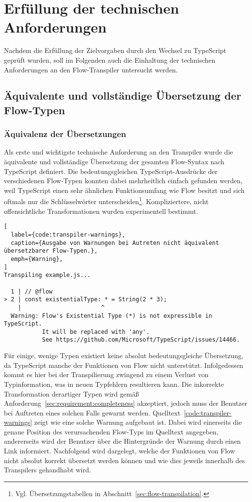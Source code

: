 \section{Erfüllung der technischen Anforderungen}

Nachdem die Erfüllung der Zielvorgaben durch den Wechsel zu TypeScript geprüft wurden, soll im Folgenden auch die Einhaltung der technischen Anforderungen an den Flow-Transpiler untersucht werden.

\subsection{Äquivalente und vollständige Übersetzung der Flow-Typen}
\label{sec:interpretation:equivalent-translation}

\subsubsection{Äquivalenz der Übersetzungen}

Als erste und wichtigste technische Anforderung an den Transpiler wurde die äquivalente und vollständige Übersetzung der gesamten Flow-Syntax nach TypeScript definiert. Die bedeutungsgleichen TypeScript-Ausdrücke der verschiedenen Flow-Typen konnten dabei mehrheitlich einfach gefunden werden, weil TypeScript einen sehr ähnlichen Funktionsumfang wie Flow besitzt und sich oftmals nur die Schlüsselwörter unterscheiden\footnote{Vgl. Übersetzungstabellen in Abschnitt~\ref{sec:flow-transpilation}.}. Kompliziertere, nicht offensichtliche Transformationen wurden experimentell bestimmt.

\begin{lstlisting}[
  label={code:transpiler-warnings},
  caption={Ausgabe von Warnungen bei Autreten nicht äquivalent übersetzbarer Flow-Typen.},
  emph={Warning},
]
Transpiling example.js...

  1 | // @flow
> 2 | const existentialType: * = String(2 * 3);
    |                       ^
  Warning: Flow's Existential Type (*) is not expressible in TypeScript.
           It will be replaced with 'any'.
           See https://github.com/Microsoft/TypeScript/issues/14466.
\end{lstlisting}

Für einige, wenige Typen existiert keine absolut bedeutungsgleiche Übersetzung, da TypeScript manche der Funktionen von Flow nicht unterstützt. Infolgedessen kommt es hier bei der Transpilierung zwingend zu einem Verlust von Typinformation, was in neuen Typfehlern resultieren kann. Die inkorrekte Transformation derartiger Typen wird gemäß Anforderung~\ref{sec:requirement:completeness} akzeptiert, jedoch muss der Benutzer bei Auftreten eines solchen Falls gewarnt werden. Quelltext~\ref{code:transpiler-warnings} zeigt wie eine solche Warnung aufgebaut ist. Dabei wird einerseits die genaue Position des verursachenden Flow-Typs im Quelltext angegeben, andererseits wird der Benutzer über die Hintergründe der Warnung durch einen Link informiert. Nachfolgend wird dargelegt, welche der Funktionen von Flow nicht absolut korrekt übersetzt werden können und wie dies jeweils innerhalb des Transpilers gehandhabt wird.

